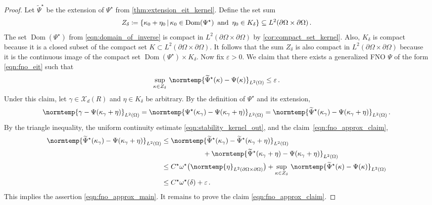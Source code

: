 \documentclass[pdflatex,sn-mathphys-num]{sn-jnl-preprint}
\let\originalleft\left %
\let\originalright\right
\renewcommand{\left}{\mathopen{}\mathclose\bgroup\originalleft}
\renewcommand{\right}{\aftergroup\egroup\originalright}
\newcommand{\cX}{\mathcal{X}}
\newcommand{\pOmega}{{\partial\Omega}}
\newcommand{\norm}{\normtemp}
\newcommand{\set}[2]{{\left\{ #1 \,\middle|\, #2 \right\}}}
\newcommand{\defeq}{\coloneqq} %
\DeclareMathOperator{\domain}{Dom} %
\newcommand{\ep}{\varepsilon}
\theoremstyle{thmstyleone}%
\theoremstyle{thmstyletwo}%
\theoremstyle{thmstylethree}%
\numberwithin{equation}{section}
\numberwithin{theorem}{section}
\begin{document}
\begin{proof}
    Let $\widetilde{\Psi}^\star$ be the extension of $\Psi^\star$ from \cref{thm:extension_eit_kernel}. Define the set sum
    \begin{align*}
        Z_\delta\defeq \set{\kappa_0+\eta_0}{\kappa_0\in \domain(\Psi^\star)\,\text{ and }\, \eta_0\in K_\delta}\subseteq L^2(\pOmega\times\pOmega)\,.
    \end{align*}
    The set $\domain(\Psi^\star)$ from \eqref{eqn:domain_of_inverse} is compact in $L^2(\pOmega\times\pOmega)$ by \cref{cor:compact_set_kernel}. Also, $K_\delta$ is compact because it is a closed subset of the compact set $K\subset L^2(\pOmega\times\pOmega)$. It follows that the sum $Z_\delta$ is also compact in $L^2(\pOmega\times\pOmega)$ because it is the continuous image of the compact set $\domain(\Psi^\star)\times K_\delta$. Now fix $\ep>0$. We claim that there exists a generalized FNO $\Psi$ of the form \eqref{eqn:fno_eit} such that
    \begin{align}\label{eqn:fno_approx_claim}
        \sup_{\kappa\in Z_\delta}\,\norm{\widetilde{\Psi}^\star(\kappa)-\Psi(\kappa)}_{L^2(\Omega)}\leq\ep\,.
    \end{align}
    Under this claim, let $\gamma\in\cX_d(R)$ and $\eta\in K_\delta$ be arbitrary. By the definition of $\Psi^\star$ and its extension,
    \begin{align*}
        \norm{\gamma - \Psi(\kappa_\gamma + \eta)}_{L^2(\Omega)}=\norm{\Psi^\star(\kappa_\gamma) - \Psi(\kappa_\gamma + \eta)}_{L^2(\Omega)}=\norm{\widetilde{\Psi}^\star(\kappa_\gamma) - \Psi(\kappa_\gamma + \eta)}_{L^2(\Omega)}\,.
    \end{align*}
    By the triangle inequality, the uniform continuity estimate \eqref{eqn:stability_kernel_out}, and the claim~\eqref{eqn:fno_approx_claim},
    \begin{align*}
        \norm{\widetilde{\Psi}^\star(\kappa_\gamma) - \Psi(\kappa_\gamma + \eta)}_{L^2(\Omega)}
        &\leq \norm{\widetilde{\Psi}^\star(\kappa_\gamma) - \widetilde{\Psi}^\star(\kappa_\gamma+\eta)}_{L^2(\Omega)}\\
        &\qquad\qquad\qquad +\norm{\widetilde{\Psi}^\star(\kappa_\gamma+\eta) - \Psi(\kappa_\gamma + \eta)}_{L^2(\Omega)}\\
        &\leq C^\star \omega^\star\bigl(\norm{\eta}_{L^2(\pOmega\times\pOmega)}\bigr) + 
        \sup_{\kappa\in Z_\delta}\,\norm{\widetilde{\Psi}^\star(\kappa) - \Psi(\kappa)}_{L^2(\Omega)}\\
        &\leq C^\star\omega^\star(\delta) + \ep\,.
    \end{align*}
    This implies the assertion \eqref{eqn:fno_approx_main}. It remains to prove the claim \eqref{eqn:fno_approx_claim}.
    

\end{proof}
\end{document}
